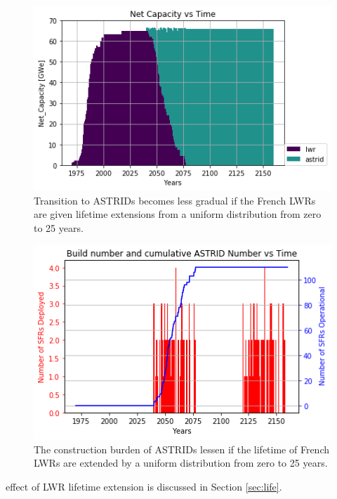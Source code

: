 \begin{figure}[htbp!]
    \begin{center}
        \includegraphics[scale=0.6]{./images/french-transition/unif_0_25.png}
    \end{center}
    \caption{Transition to \glspl{ASTRID} becomes less gradual if the
             French \glspl{LWR} are given lifetime extensions from a 
             uniform distribution from zero to 25 years.}
    \label{fig:sfr_num_norm}
\end{figure}

\begin{figure}[htbp!]
    \begin{center}
        \includegraphics[scale=0.6]{./images/french-transition/unif_0_25_dep.png}
    \end{center}
    \caption{The construction burden of \glspl{ASTRID} lessen if the
             lifetime of French \glspl{LWR} are extended by a uniform
             distribution from zero to 25 years.}
    \label{fig:sfr_dep_norm}
\end{figure}

effect of \gls{LWR} lifetime extension is discussed in Section \ref{sec:life}.

